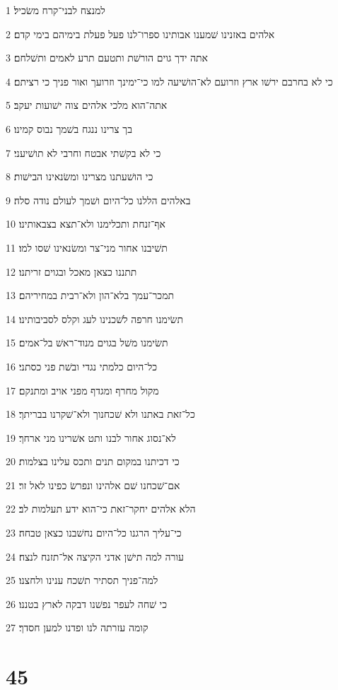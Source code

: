 \par 1 למנצח לבני־קרח משׂכיל׃
\par 2 אלהים באזנינו שׁמענו אבותינו ספרו־לנו פעל פעלת בימיהם בימי קדם׃
\par 3 אתה ידך גוים הורשׁת ותטעם תרע לאמים ותשׁלחם׃
\par 4 כי לא בחרבם ירשׁו ארץ וזרועם לא־הושׁיעה למו כי־ימינך וזרועך ואור פניך כי רציתם׃
\par 5 אתה־הוא מלכי אלהים צוה ישׁועות יעקב׃
\par 6 בך צרינו ננגח בשׁמך נבוס קמינו׃
\par 7 כי לא בקשׁתי אבטח וחרבי לא תושׁיעני׃
\par 8 כי הושׁעתנו מצרינו ומשׂנאינו הבישׁות׃
\par 9 באלהים הללנו כל־היום ושׁמך לעולם נודה סלה׃
\par 10 אף־זנחת ותכלימנו ולא־תצא בצבאותינו׃
\par 11 תשׁיבנו אחור מני־צר ומשׂנאינו שׁסו למו׃
\par 12 תתננו כצאן מאכל ובגוים זריתנו׃
\par 13 תמכר־עמך בלא־הון ולא־רבית במחיריהם׃
\par 14 תשׂימנו חרפה לשׁכנינו לעג וקלס לסביבותינו׃
\par 15 תשׂימנו משׁל בגוים מנוד־ראשׁ בל־אמים׃
\par 16 כל־היום כלמתי נגדי ובשׁת פני כסתני׃
\par 17 מקול מחרף ומגדף מפני אויב ומתנקם׃
\par 18 כל־זאת באתנו ולא שׁכחנוך ולא־שׁקרנו בבריתך׃
\par 19 לא־נסוג אחור לבנו ותט אשׁרינו מני ארחך׃
\par 20 כי דכיתנו במקום תנים ותכס עלינו בצלמות׃
\par 21 אם־שׁכחנו שׁם אלהינו ונפרשׂ כפינו לאל זר׃
\par 22 הלא אלהים יחקר־זאת כי־הוא ידע תעלמות לב׃
\par 23 כי־עליך הרגנו כל־היום נחשׁבנו כצאן טבחה׃
\par 24 עורה למה תישׁן אדני הקיצה אל־תזנח לנצח׃
\par 25 למה־פניך תסתיר תשׁכח ענינו ולחצנו׃
\par 26 כי שׁחה לעפר נפשׁנו דבקה לארץ בטננו׃
\par 27 קומה עזרתה לנו ופדנו למען חסדך׃

\chapter{45}

